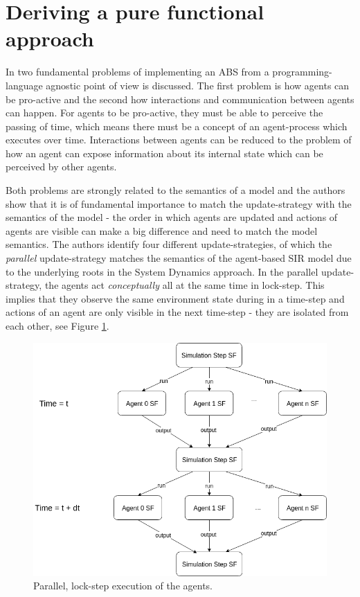\section{Deriving a pure functional approach}
\label{sec:functional_approach}


In \cite{thaler_art_2017} two fundamental problems of implementing an ABS from a programming-language agnostic point of view is discussed. The first problem is how agents can be pro-active and the second how interactions and communication between agents can happen. For agents to be pro-active, they must be able to perceive the passing of time, which means there must be a concept of an agent-process which executes over time. Interactions between agents can be reduced to the problem of how an agent can expose information about its internal state which can be perceived by other agents. 

Both problems are strongly related to the semantics of a model and the authors show that it is of fundamental importance to match the update-strategy with the semantics of the model - the order in which agents are updated and actions of agents are visible can make a big difference and need to match the model semantics. The authors identify four different update-strategies, of which the \textit{parallel} update-strategy matches the semantics of the agent-based SIR model due to the underlying roots in the System Dynamics approach. In the parallel update-strategy, the agents act \textit{conceptually} all at the same time in lock-step. This implies that they observe the same environment state during in a time-step and actions of an agent are only visible in the next time-step - they are isolated from each other, see Figure \ref{fig:parallel_strategy}.

\begin{figure}
	\centering
	\includegraphics[width=.4\textwidth, angle=0]{./fig/diagrams/parallel_strategy.png}
	\caption{Parallel, lock-step execution of the agents.}
	\label{fig:parallel_strategy}
\end{figure}


